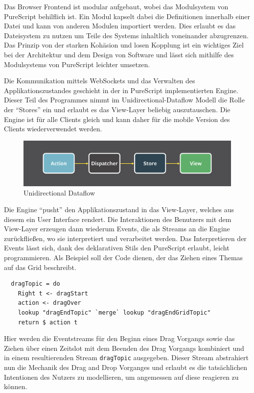 Das Browser Frontend ist modular aufgebaut, wobei das Modulsystem von
\gls{PureScript} behilflich ist. Ein Modul kapselt dabei die
Definitionen innerhalb einer Datei und kann von anderen Modulen
importiert werden. Dies erlaubt es das Dateisystem zu nutzen um Teile
des Systems inhaltlich voneinander abzugrenzen. Das Prinzip von der
starken Kohäsion und losen Kopplung ist ein wichtiges Ziel bei der
Architektur und dem Design von Software und lässt sich mithilfe des
Modulsystems von PureScript leichter umsetzen.

Die Kommunikation mittels WebSockets und das Verwalten des
Applikationszustandes geschieht in der in \gls{PureScript}
implementierten Engine. Dieser Teil des Programmes nimmt im
Unidirectional-Dataflow Modell die Rolle der ``Stores'' ein und
erlaubt es das View-Layer beliebig auszutauschen. Die Engine ist für
alle Clients gleich und kann daher für die mobile Version des Clients
wiederverwendet werden.

\begin{figure}[h]
\includegraphics[scale=0.3]{img/Unidirectional.png}
\caption{Unidirectional Dataflow}
\end{figure}

\noindent Die Engine ``pusht'' den Applikationszustand in das
View-Layer, welches aus diesem ein User Interface rendert.
Die Interaktionen des Benutzers mit dem View-Layer erzeugen dann
wiederum Events, die als Streams an die Engine zurückfließen, wo sie
interpretiert und verarbeitet werden. Das Interpretieren der Events
lässt sich, dank des deklarativen Stils den PureScript erlaubt, leicht
programmieren. Als Beispiel soll der Code dienen, der das Ziehen eines
Themas auf das Grid beschreibt.

\begin{lstlisting}
  dragTopic = do
    Right t <- dragStart
    action <- dragOver
    lookup "dragEndTopic" `merge` lookup "dragEndGridTopic"
    return $ action t
\end{lstlisting}
\noindent Hier werden die Eventstreams für den Beginn eines
Drag Vorgangs sowie das Ziehen über einen Zeitslot mit dem Beenden des
Drag Vorgangs kombiniert und in einem resultierenden Stream \texttt{dragTopic}
ausgegeben. Dieser Stream abstrahiert nun die Mechanik des Drag and
Drop Vorganges und erlaubt es die tatsächlichen Intentionen des
Nutzers zu modellieren, um angemessen auf diese reagieren zu können.
